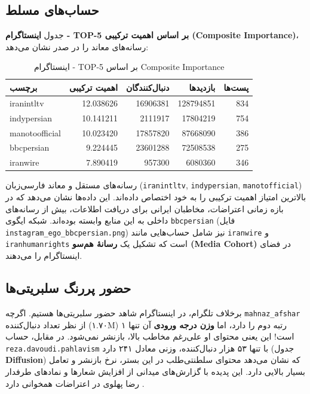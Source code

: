 \documentclass{article}
\begin{document}
	\subsection{حساب‌های مسلط}
	جدول \textbf{اینستاگرام - TOP-5 بر اساس اهمیت ترکیبی (Composite Importance)}، رسانه‌های معاند را در صدر نشان می‌دهد:
	
	\begin{longtable}{lrrrr}
		\caption{اینستاگرام - TOP-5 بر اساس Composite Importance} \\
		\toprule
		\textbf{برچسب} & \textbf{اهمیت ترکیبی} & \textbf{دنبال‌کنندگان} & \textbf{بازدیدها} & \textbf{پست‌ها} \\
		\midrule
		iranintltv          & 12.038626 & 16906381 & 128794851 & 834 \\
		indypersian         & 10.141211 & 2111917  & 17804219  & 754 \\
		manotoofficial      & 10.023420 & 17857820 & 87668090  & 386 \\
		bbcpersian          & 9.224445  & 23601288 & 72508538  & 275 \\
		iranwire            & 7.890419  & 957300   & 6080360   & 346 \\
		\bottomrule
	\end{longtable}
	

	رسانه‌های مستقل و معاند فارسی‌زبان (\texttt{iranintltv}, \texttt{indypersian}, \texttt{manotofficial}) بالاترین امتیاز اهمیت ترکیبی را به خود اختصاص داده‌اند. این داده‌ها نشان می‌دهد که در بازه زمانی اعتراضات، مخاطبان ایرانی برای دریافت اطلاعات، بیش از رسانه‌های داخلی به این منابع وابسته بوده‌اند. شبکه ایگوی \texttt{bbcpersian} (فایل \texttt{instagram\_ego\_bbcpersian.png}) نیز شامل حساب‌هایی مانند \texttt{iranwire} و \texttt{iranhumanrights} است که تشکیل یک \textbf{رسانۀ هم‌سو (Media Cohort)} در فضای اینستاگرام را می‌دهند.
	
	\subsection{حضور پررنگ سلبریتی‌ها}
	برخلاف تلگرام، در اینستاگرام شاهد حضور سلبریتی‌ها هستیم. اگرچه \texttt{mahnaz\_afshar} از نظر تعداد دنبال‌کننده (۱.۷۰M) رتبه دوم را دارد، اما \textbf{وزن درجه ورودی} آن تنها ۱ است! این یعنی محتوای او علی‌رغم مخاطب بالا، بازنشر نمی‌شود. در مقابل، حساب \texttt{reza.davoudi.pahlavism} با تنها ۵۳ هزار دنبال‌کننده، وزنی معادل ۲۴۱ دارد (جدول \textbf{Diffusion}) که نشان می‌دهد محتوای سلطنتی‌طلب در این بستر، نرخ بازنشر و تعامل بسیار بالایی دارد. این پدیده با گزارش‌های میدانی از افزایش شعارها و نمادهای طرفدار رضا پهلوی در اعتراضات همخوانی دارد .
	
\end{document}
